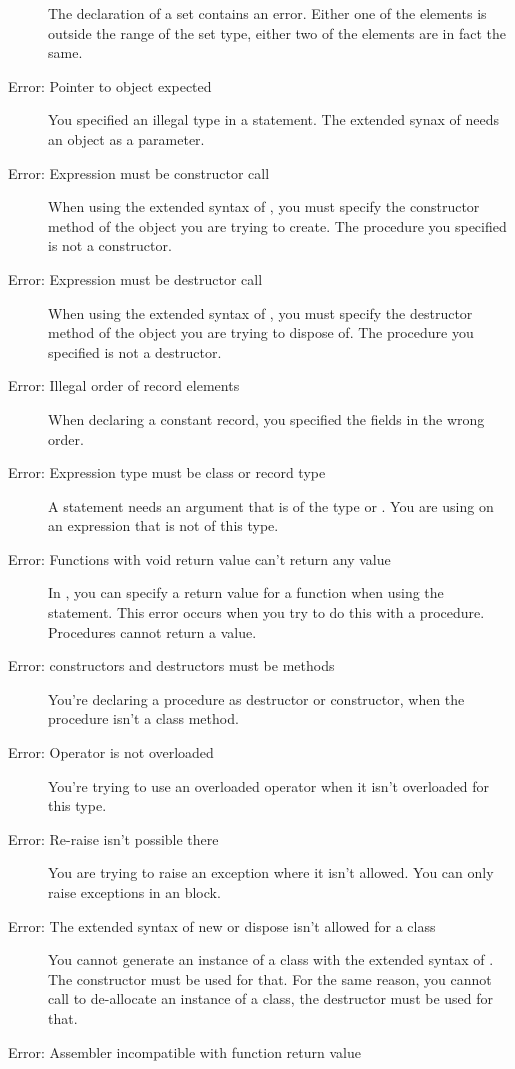 \begin{description}
 The declaration of a set contains an error. Either one of the elements is
 outside the range of the set type, either two of the elements are in fact
 the same.
\item [Error: Pointer to object expected]
 You specified an illegal type in a  statement. 
 The extended synax of  needs an  object as a parameter.
\item [Error: Expression must be constructor call]
 When using the extended syntax of , you must specify the constructor
 method of the object you are trying to create. The procedure you specified
 is not a constructor.
\item [Error: Expression must be destructor call]
 When using the extended syntax of , you must specify the
 destructor method of the object you are trying to dispose of. 
 The procedure you specified is not a destructor.
\item [Error: Illegal order of record elements]
 When declaring a constant record, you specified the fields in the wrong
 order.
\item [Error: Expression type must be class or record type]
 A  statement needs an argument that is of the type  
 or . You are using  on an expression that is not of 
 this type.
\item [Error: Functions with void return value can't return any value]
 In \fpc, you can specify a return value for a function when using 
 the  statement. This error occurs when you try to do this with a
 procedure. Procedures  cannot return a value.
\item [Error: constructors and destructors must be methods]
 You're declaring a procedure as destructor or constructor, when the
 procedure isn't a class method.
\item [Error: Operator is not overloaded]
 You're trying to use an overloaded operator when it isn't overloaded for
 this type.
\item [Error: Re-raise isn't possible there]
 You are trying to raise an exception where it isn't allowed. You can only
 raise exceptions in an  block.
\item [Error: The extended syntax of new or dispose isn't allowed for a class]
 You cannot generate an instance of a class with the extended syntax of 
 . The constructor must be used for that. For the same reason, you
 cannot call  to de-allocate an instance of a class, the
 destructor must be used for that.
\item [Error: Assembler incompatible with function return value]

\end{description}
